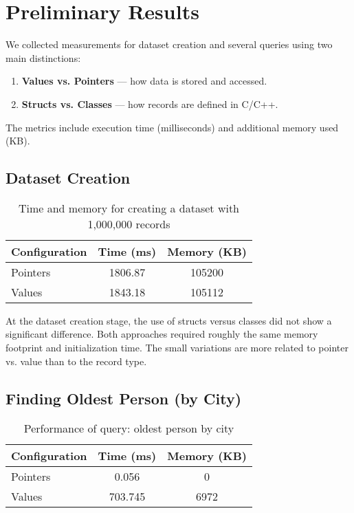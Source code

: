\documentclass[11pt,letterpaper,oneside]{article}
\begin{document}
\section{Preliminary Results}

We collected measurements for dataset creation and several queries using two
main distinctions:
\begin{enumerate}
    \item \textbf{Values vs. Pointers} — how data is stored and accessed.
    \item \textbf{Structs vs. Classes} — how records are defined in C/C++.
\end{enumerate}

The metrics include execution time (milliseconds) and additional memory used
(KB).

\subsection{Dataset Creation}

\begin{table}[h!]
\centering
\begin{tabular}{|l|c|c|}
\hline
\textbf{Configuration} & \textbf{Time (ms)} & \textbf{Memory (KB)} \\
\hline
Pointers & 1806.87 & 105200 \\
Values   & 1843.18 & 105112 \\
\hline
\end{tabular}
\caption{Time and memory for creating a dataset with 1,000,000 records}
\end{table}

At the dataset creation stage, the use of structs versus classes did not show a
significant difference. Both approaches required roughly the same memory
footprint and initialization time. The small variations are more related to
pointer vs. value than to the record type.

\subsection{Finding Oldest Person (by City)}

\begin{table}[h!]
\centering
\begin{tabular}{|l|c|c|}
\hline
\textbf{Configuration} & \textbf{Time (ms)} & \textbf{Memory (KB)} \\
\hline
Pointers & 0.056 & 0 \\
Values   & 703.745 & 6972 \\
\hline
\end{tabular}
\caption{Performance of query: oldest person by city}
\end{table}
\end{document}

